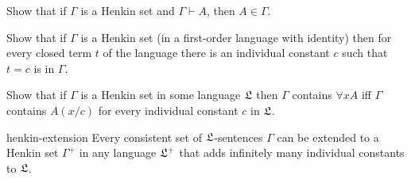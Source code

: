 \begin{exercise}\label{ex:henkin-closure}
  Show that if $\Gamma$ is a Henkin set and $\Gamma \vdash A$, then $A \in \Gamma$.
\end{exercise}

\begin{exercise}\label{ex:henkin-terms-constants}
  Show that if $\Gamma$ is a Henkin set (in a first-order language with identity) then
  for every closed term $t$ of the language
  there is an individual constant $c$ such that $t=c$ is in $\Gamma$.
\end{exercise}

\begin{exercise}\label{ex:henkin-quantifiers-prf}
  Show that if $\Gamma$ is a Henkin set in some language $\mathfrak{L}$ then
  $\Gamma$ contains $\forall x A$ iff
  $\Gamma$ contains $A(x/c)$ for every individual constant $c$ in $\mathfrak{L}$.
\end{exercise}

\begin{lemma}{}{henkin-extension}
  Every consistent set of $\mathfrak{L}$-sentences $\Gamma$ can be extended
  to a Henkin set $\Gamma^+$ in any language $\mathfrak{L}^{+}$ that adds infinitely many individual constants to $\mathfrak{L}$.
\end{lemma}

